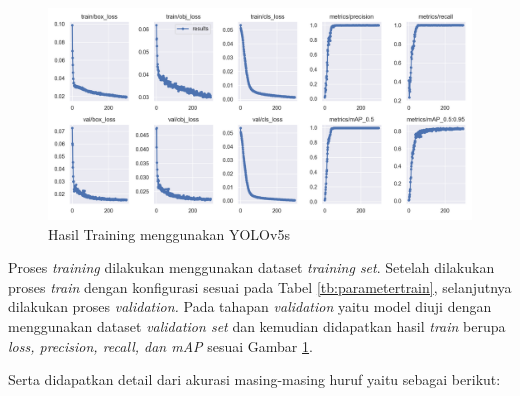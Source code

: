 \begin{figure}[H]
  \centering
  \includegraphics[scale=0.5]{gambar/train_results.png}
  \caption{Hasil Training menggunakan YOLOv5s}
  \label{fig:trainresult}
\end{figure}

Proses \textit{training} dilakukan menggunakan dataset \textit{training set}. Setelah dilakukan proses \textit{train} dengan konfigurasi sesuai pada Tabel \ref*{tb:parametertrain}, selanjutnya dilakukan proses \textit{validation.} Pada tahapan \textit{validation} yaitu model diuji dengan menggunakan dataset \textit{validation set} dan kemudian didapatkan hasil \textit{train} berupa \textit{loss, precision, recall, \textnormal{dan} mAP} sesuai Gambar \ref*{fig:trainresult}. \par

Serta didapatkan detail dari akurasi masing-masing huruf yaitu sebagai berikut: \par

